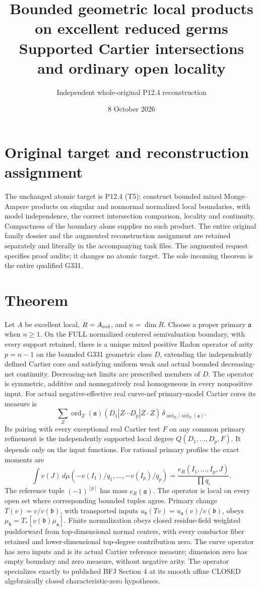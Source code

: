 \documentclass[11pt]{article}
\title{Bounded geometric local products on excellent reduced germs\\Supported Cartier intersections and ordinary open locality}
\author{Independent whole-original P12.4 reconstruction}
\date{8 October 2026}
\begin{document}
\maketitle

\section*{Original target and reconstruction assignment}
The unchanged atomic target is P12.4 (T5): construct bounded mixed
Monge--Ampere products on singular and nonnormal normalized local boundaries,
with model independence, the correct intersection comparison, locality and
continuity. Compactness of the boundary alone supplies no such product.
The entire original family dossier and the augmented reconstruction assignment
are retained separately and literally in the accompanying task files.
The augmented request specifies proof audits; it changes no atomic target.
The sole incoming theorem is the entire qualified G331.

\section*{Theorem}
Let \(A\) be excellent local, \(R=A_{\rm red}\), and \(n=\dim R\).
Choose a proper primary \(\mathfrak a\) when \(n\ge1\). On the FULL
normalized centered semivaluation boundary, with every support retained,
there is a unique mixed positive Radon operator of arity \(p=n-1\)
on the bounded G331 geometric class \(D\), extending the independently
defined Cartier core and satisfying uniform weak and actual bounded
decreasing-net continuity. Decreasing-net limits are prescribed members of
\(D\). The operator is symmetric, additive and nonnegatively real homogeneous
in every nonpositive input. For actual negative-effective real curve-nef
primary-model Cartier cores its measure is
\[
\sum_Z \operatorname{ord}_Z(\mathfrak a)
 (D_1|Z\cdots D_p|Z\cdot Z)\,
 \delta_{\operatorname{ord}_Z/\operatorname{ord}_Z(\mathfrak a)}.
\]
Its pairing with every exceptional real Cartier test \(F\) on any common
primary refinement is the independently supported local degree
\(Q(D_1,\ldots,D_p,F)\). It depends only on the input functions.
For rational primary profiles the exact moments are
\[
\int v(J)\,d\mu(-v(I_1)/q_1,\ldots,-v(I_p)/q_p)
=\frac{e_R(I_1,\ldots,I_p,J)}{\prod q_i}.
\]
The reference tuple \((-1)^{[p]}\) has mass \(e_R(\mathfrak a)\).
The operator is local on every open set where corresponding bounded tuples
agree. Primary change \(T(v)=v/v(\mathfrak b)\), with transported inputs
\(u_{\mathfrak b}(Tv)=u_{\mathfrak a}(v)/v(\mathfrak b)\), obeys
\(\mu_{\mathfrak b}=T_*[v(\mathfrak b)\mu_{\mathfrak a}]\).
Finite normalization obeys closed residue-field weighted pushforward from
top-dimensional normal centers, with every conductor fiber retained and
lower-dimensional top-degree contribution zero. The curve operator has
zero inputs and is its actual Cartier reference measure; dimension zero
has empty boundary and zero measure, without negative arity.
The operator specializes exactly to published BFJ Section 4 at its smooth
affine CLOSED algebraically closed characteristic-zero hypotheses.
\end{document}
